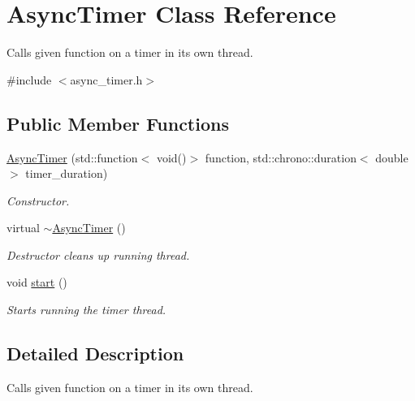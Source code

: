 \hypertarget{classAsyncTimer}{\section{Async\-Timer Class Reference}
\label{classAsyncTimer}
}


Calls given function on a timer in its own thread.  




{\ttfamily \#include $<$async\-\_\-timer.\-h$>$}

\subsection*{Public Member Functions}
\begin{DoxyCompactItemize}
\item 
\hyperlink{classAsyncTimer_a8509db3cc448bd8f313435150baf434d}{Async\-Timer} (std\-::function$<$ void()$>$ function, std\-::chrono\-::duration$<$ double $>$ timer\-\_\-duration)
\begin{DoxyCompactList}\small\item\em Constructor. \end{DoxyCompactList}\item 
virtual \hyperlink{classAsyncTimer_a92781264c62bcbad0b9ffd447d0cb3fd}{$\sim$\-Async\-Timer} ()
\begin{DoxyCompactList}\small\item\em Destructor cleans up running thread. \end{DoxyCompactList}\item 
void \hyperlink{classAsyncTimer_ab058544794ccb0310eb5a803458de860}{start} ()
\begin{DoxyCompactList}\small\item\em Starts running the timer thread. \end{DoxyCompactList}\end{DoxyCompactItemize}


\subsection{Detailed Description}
Calls given function on a timer in its own thread. 


